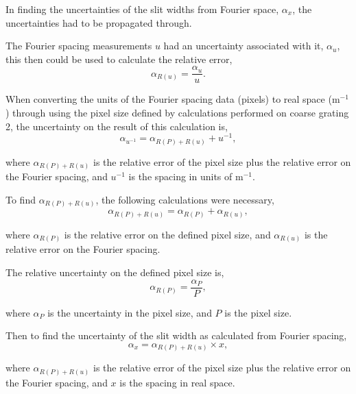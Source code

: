 \documentclass[twocolumn]{revtex4}
\begin{document}
In finding the uncertainties of the slit widths from Fourier space, $\alpha_x$, the uncertainties had to be propagated through.

The Fourier spacing measurements $u$ had an uncertainty associated with it, $\alpha_u$, this then could be used to calculate the relative error, 
\begin{equation}
\alpha_{R(u)}=\frac{\alpha_u}{u}.
\end{equation}

When converting the units of the Fourier spacing data (pixels) to real space (m$^{-1}$) through using the pixel size defined by calculations performed on coarse grating 2, the uncertainty on the result of this calculation is,
\begin{equation}
\alpha_{u^{-1}}=\alpha_{R(P)+R(u)}+{u^{-1}},
\end{equation}

where $\alpha_{R(P)+R(u)}$ is the relative error of the pixel size plus the relative error on the Fourier spacing, and $u^{-1}$ is the spacing in units of m$^{-1}$.

To find $\alpha_{R(P)+R(u)}$, the following calculations were necessary,
\begin{equation}
\alpha_{R(P)+R(u)} = \alpha_{R(P)} + \alpha_{R(u)},
\end{equation}

where $\alpha_{R(P)}$ is the relative error on the defined pixel size, and $\alpha_{R(u)}$ is the relative error on the Fourier spacing. 

The relative uncertainty on the defined pixel size is,
\begin{equation}
\alpha_{R(P)} = \frac{\alpha_P}{P},
\end{equation}

where $\alpha_P$ is the uncertainty in the pixel size, and $P$ is the pixel size. 

Then to find the uncertainty of the slit width as calculated from Fourier spacing,
\begin{equation}
\alpha_x = \alpha_{R(P)+R(u)}  \times x,
\end{equation}

where $\alpha_{R(P)+R(u)}$ is the relative error of the pixel size plus the relative error on the Fourier spacing, and $x$ is the spacing in real space.

\clearpage
\end{document}
